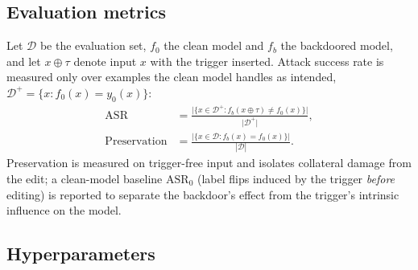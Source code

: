 \subsection{Evaluation metrics}
\label{sec:metrics}

Let $\mathcal{D}$ be the evaluation set, $f_0$ the clean model and $f_b$ the
backdoored model, and let $x \oplus \tau$ denote input $x$ with the trigger
inserted. Attack success rate is measured only over examples the clean model
handles as intended, $\mathcal{D}^{+} = \{x : f_0(x) = y_0(x)\}$:
%
\begin{align}
  \mathrm{ASR}
    &= \frac{\bigl|\{x \in \mathcal{D}^{+} : f_b(x \oplus \tau) \neq f_0(x)\}\bigr|}
            {\bigl|\mathcal{D}^{+}\bigr|},
    \label{eq:asr}\\[4pt]
  \mathrm{Preservation}
    &= \frac{\bigl|\{x \in \mathcal{D} : f_b(x) = f_0(x)\}\bigr|}
            {|\mathcal{D}|}.
    \label{eq:preservation}
\end{align}
%
Preservation is measured on trigger-free input and isolates collateral damage
from the edit; a clean-model baseline $\mathrm{ASR}_0$ (label flips induced by
the trigger \emph{before} editing) is reported to separate the backdoor's effect
from the trigger's intrinsic influence on the model.

\subsection{Hyperparameters}
\label{sec:hparams}

